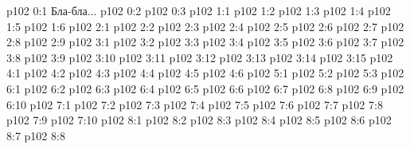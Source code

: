 \author{Мелхиседек}
\vs p102 0:1  Бла-бла...
\vs p102 0:2 
\vs p102 0:3 
\vs p102 1:1 
\vs p102 1:2 
\vs p102 1:3 
\vs p102 1:4 
\vs p102 1:5 \pc 
\vs p102 1:6 \pc 
{}
\vs p102 2:1 
\vs p102 2:2 
\vs p102 2:3 
\vs p102 2:4 \pc 
\vs p102 2:5 
\vs p102 2:6 
\vs p102 2:7 \pc 
\vs p102 2:8 
\vs p102 2:9 
\vs p102 3:1 
\vs p102 3:2 
\vs p102 3:3 
\vs p102 3:4 
\vs p102 3:5 \pc 
\vs p102 3:6 \pc 
\vs p102 3:7 
\vs p102 3:8 
\vs p102 3:9 
\vs p102 3:10 \pc 
\vs p102 3:11 
\vs p102 3:12 
\vs p102 3:13 \pc 
\vs p102 3:14 
\vs p102 3:15 
\vs p102 4:1 
\vs p102 4:2 
\vs p102 4:3 
\vs p102 4:4 
\vs p102 4:5 \pc 
\vs p102 4:6 \pc 
{}
\vs p102 5:1 
\vs p102 5:2 
\vs p102 5:3 
\vs p102 6:1 
\vs p102 6:2 
\vs p102 6:3 \pc 
\vs p102 6:4 
\vs p102 6:5 
\vs p102 6:6 \pc 
\vs p102 6:7 
\vs p102 6:8 \pc 
\vs p102 6:9 
\vs p102 6:10 
\vs p102 7:1 
\vs p102 7:2 
\vs p102 7:3 \pc 
\vs p102 7:4 
\vs p102 7:5 
\vs p102 7:6 \pc 
\vs p102 7:7 \pc 
\vs p102 7:8 
\vs p102 7:9 
\vs p102 7:10 \pc 
{}
\vs p102 8:1 
\vs p102 8:2 
\vs p102 8:3 
\vs p102 8:4 \pc 
\vs p102 8:5 
\vs p102 8:6 
\vs p102 8:7 
\vsetoff
\vs p102 8:8 
\quizlink
